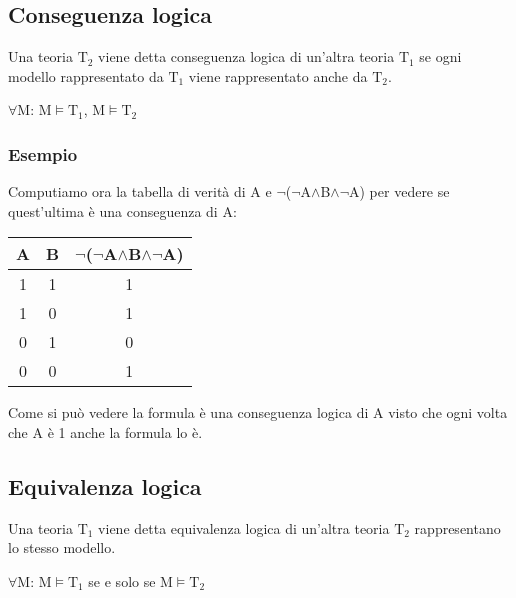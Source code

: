 \documentclass[../main.tex]{subfiles}
\begin{document}
    \subsection{Conseguenza logica}
    Una teoria $\text{T}_2$ viene detta conseguenza logica di un'altra teoria $\text{T}_1$ se ogni modello rappresentato da $\text{T}_1$ viene rappresentato anche da $\text{T}_2$.
    \begin{center}
        $\forall$M: M$\models$$\text{T}_1$,  M$\models$$\text{T}_2$
    \end{center}

    \subsubsection{Esempio}
    Computiamo ora la tabella di verità di A e $\lnot$($\lnot$A$\land$B$\land$$\lnot$A) per vedere se quest'ultima è una conseguenza di A:
    \begin{center}
        \begin{tabular}{|c|c|c|}
            \hline
            A & B & $\lnot$($\lnot$A$\land$B$\land$$\lnot$A)\\
            \hline
            1 & 1 & 1\\
            \hline
            1 & 0 & 1\\
            \hline
            0 & 1 & 0\\
            \hline
            0 & 0 & 1\\
            \hline
        \end{tabular}
    \end{center}
    Come si può vedere la formula è una conseguenza logica di A visto che ogni volta che A è 1 anche la formula lo è.

    \subsection{Equivalenza logica}
    Una teoria $\text{T}_1$ viene detta equivalenza logica di un'altra teoria $\text{T}_2$ rappresentano lo stesso modello.
    \begin{center}
        $\forall$M: M$\models$$\text{T}_1$ se e solo se M$\models$$\text{T}_2$
    \end{center}
\end{document}
